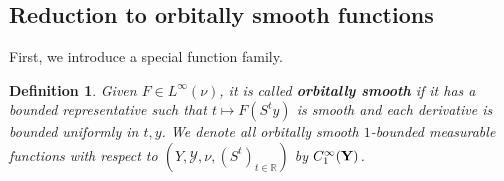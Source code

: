 \documentclass[reqno,12pt]{amsart}
\newtheorem{lemma}[thm]{Lemma}
\newtheorem{defn}[thm]{Definition}
\def \R {\mathbb R}
\def \Y {\mathcal{Y}}
\numberwithin{equation}{section}
\begin{document}
\subsection{Reduction to orbitally smooth functions}
First, we introduce a special function family.
\begin{defn}
	Given $F\in L^{\infty}(\nu)$, it is called \textbf{orbitally smooth} if it has a bounded representative such that
	$t\mapsto F(S^t y)$ is smooth and each derivative is bounded uniformly in $t,y$. We denote all orbitally smooth $1$-bounded measurable functions with respect to $(Y,\Y,\nu,(S^t)_{t\in \R})$ by $C^{\infty}_{1}({\bf Y})$. 
\end{defn}
\end{document}
